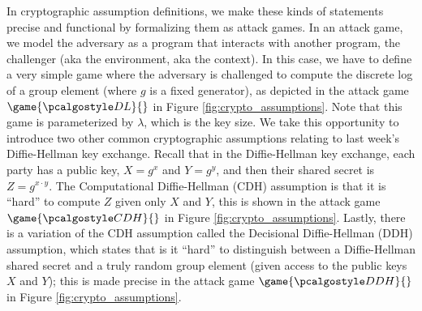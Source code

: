 \documentclass[12pt]{article}
\theoremstyle{definition}
\theoremstyle{remark}
\theoremstyle{definition}
\begin{document}
In cryptographic assumption definitions, we make these kinds of statements precise and functional by formalizing them as attack games. In an attack game, we model the adversary as a program that interacts with another program, the challenger (aka the environment, aka the context). In this case, we have to define a very simple game where the adversary is challenged to compute the discrete log of a group element (where $g$ is a fixed generator), as depicted in the attack game $\game{\algo{DL}}{}$ in Figure \ref{fig:crypto_assumptions}. Note that this game is parameterized by $\lambda$, which is the key size. We take this opportunity to introduce two other common cryptographic assumptions relating to last week's Diffie-Hellman key exchange. Recall that in the Diffie-Hellman key exchange, each party has a public key, $X = g^x$ and $Y = g^y$, and then their shared secret is $Z = g^{x\cdot y}$. The Computational Diffie-Hellman (CDH) assumption is that it is ``hard'' to compute $Z$ given only $X$ and $Y$, this is shown in the attack game $\game{\algo{CDH}}{}$ in Figure \ref{fig:crypto_assumptions}. Lastly, there is a variation of the CDH assumption called the Decisional Diffie-Hellman (DDH) assumption, which states that is it ``hard'' to distinguish between a Diffie-Hellman shared secret and a truly random group element (given access to the public keys $X$ and $Y$); this is made precise in the attack game $\game{\algo{DDH}}{}$ in Figure \ref{fig:crypto_assumptions}.
\end{document}
